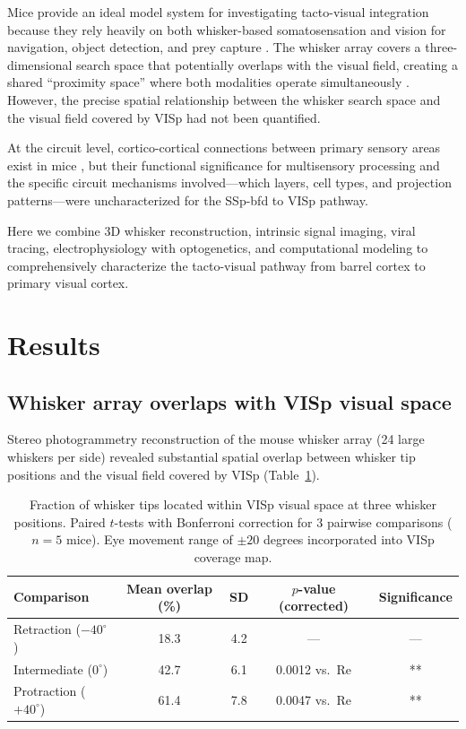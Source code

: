 \documentclass[11pt]{article}
\begin{document}
Mice provide an ideal model system for investigating tacto-visual integration because they rely heavily on both whisker-based somatosensation and vision for navigation, object detection, and prey capture \citep{diamond2008, petersen2007}. The whisker array covers a three-dimensional search space that potentially overlaps with the visual field, creating a shared ``proximity space'' where both modalities operate simultaneously \citep{knutsen2008}. However, the precise spatial relationship between the whisker search space and the visual field covered by VISp had not been quantified.

At the circuit level, cortico-cortical connections between primary sensory areas exist in mice \citep{wang2020atlas}, but their functional significance for multisensory processing and the specific circuit mechanisms involved---which layers, cell types, and projection patterns---were uncharacterized for the SSp-bfd to VISp pathway.

Here we combine 3D whisker reconstruction, intrinsic signal imaging, viral tracing, electrophysiology with optogenetics, and computational modeling to comprehensively characterize the tacto-visual pathway from barrel cortex to primary visual cortex.

\section{Results}

\subsection{Whisker array overlaps with VISp visual space}

Stereo photogrammetry reconstruction of the mouse whisker array (24 large whiskers per side) revealed substantial spatial overlap between whisker tip positions and the visual field covered by VISp (Table~\ref{tab:overlap}).

\begin{table}[H]
\centering
\caption{Fraction of whisker tips located within VISp visual space at three whisker positions. Paired $t$-tests with Bonferroni correction for 3 pairwise comparisons ($n = 5$ mice). Eye movement range of $\pm 20$ degrees incorporated into VISp coverage map.}
\label{tab:overlap}
\begin{tabular}{lcccc}
\toprule
\textbf{Comparison} & \textbf{Mean overlap (\%)} & \textbf{SD} & \textbf{$p$-value (corrected)} & \textbf{Significance} \\
\midrule
Retraction ($-40^{\circ}$) & 18.3 & 4.2 & --- & --- \\
Intermediate ($0^{\circ}$) & 42.7 & 6.1 & 0.0012 vs.\ Re & ** \\
Protraction ($+40^{\circ}$) & 61.4 & 7.8 & 0.0047 vs.\ Re & ** \\
\bottomrule
\end{tabular}
\end{table}
\end{document}
